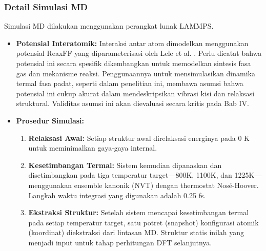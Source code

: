 \subsubsection{Detail Simulasi MD}
Simulasi MD dilakukan menggunakan perangkat lunak LAMMPS.
\begin{itemize}
    \item \textbf{Potensial Interatomik:} Interaksi antar atom dimodelkan menggunakan potensial ReaxFF yang diparameterisasi oleh Lele et al.
\cite{Lele2022}. Perlu dicatat bahwa potensial ini secara spesifik dikembangkan untuk memodelkan sintesis fasa gas dan mekanisme reaksi.
Penggunaannya untuk mensimulasikan dinamika termal fasa padat, seperti dalam penelitian ini, membawa asumsi bahwa potensial ini cukup akurat dalam mendeskripsikan vibrasi kisi dan relaksasi struktural.
Validitas asumsi ini akan dievaluasi secara kritis pada Bab IV.
\item \textbf{Prosedur Simulasi:}
    \begin{enumerate}
        \item \textbf{Relaksasi Awal:} Setiap struktur awal direlaksasi energinya pada 0 K untuk meminimalkan gaya-gaya internal.
\item \textbf{Kesetimbangan Termal:} Sistem kemudian dipanaskan dan disetimbangkan pada tiga temperatur target—800K, 1100K, dan 1225K—menggunakan ensemble kanonik (NVT) dengan thermostat Nosé-Hoover.
Langkah waktu integrasi yang digunakan adalah 0.25 fs.
        \item \textbf{Ekstraksi Struktur:} Setelah sistem mencapai kesetimbangan termal pada setiap temperatur target, satu potret (snapshot) konfigurasi atomik (koordinat) diekstraksi dari lintasan MD.
Struktur statis inilah yang menjadi input untuk tahap perhitungan DFT selanjutnya.
\end{enumerate}
\end{itemize}

